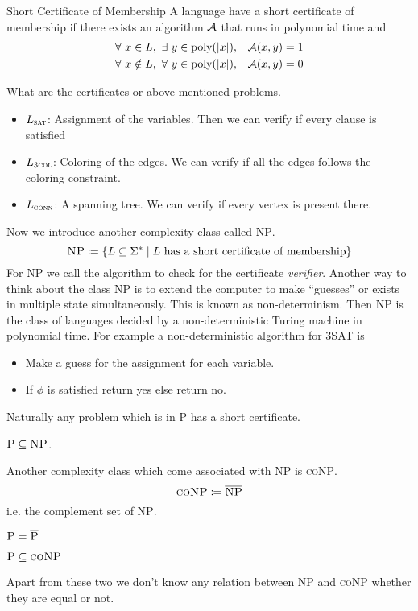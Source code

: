 \begin{Definition}{Short Certificate of Membership}{}
    A language have a short certificate of membership if there exists an algorithm $\mathcal{A}$ that runs in polynomial time and \begin{align*}
        \forall\ x\in L,\ \exists\ y\in \text{poly}(|x|),       & \quad \mathcal{A}(x,y)=1  \\
        \forall\ x\notin L,\ \forall\ y\in \text{poly}(|x|), & \quad  \mathcal{A}(x,y)=0
    \end{align*}
\end{Definition}
What are the certificates or above-mentioned problems.   \begin{itemize}
    \item $L_{\textsc{sat}}$: Assignment of the variables. Then we can verify if every clause is satisfied
    \item $L_{\textsc{3col}}$: Coloring of the edges.  We can verify if all the edges follows the coloring constraint.
    \item $L_{\textsc{conn}}$: A spanning tree. We can verify if every vertex is present there.
\end{itemize}

Now we introduce another complexity class called \textsc{NP}. $$\textsc{NP}\coloneqq \{L\subseteq \Sigma^*\mid L\text{ has a short certificate of membership}\}$$For \textsc{NP} we call the algorithm to check for the certificate \emph{verifier}.  Another way to think about the class \textsc{NP} is to extend the computer to make ``guesses'' or exists in multiple state simultaneously. This is known as non-determinism. Then \textsc{NP} is the class of languages decided by a non-deterministic Turing machine in polynomial time. For example a non-deterministic algorithm for \textsc{3SAT} is \begin{itemize}
    \item Make a guess for the assignment for each variable.
    \item If $\phi$ is satisfied return yes else return no.
\end{itemize}\parinf Naturally any problem which is in \textsc{P} has a short certificate. \begin{Theorem}{}{}
    $\textsc{P}\subseteq \textsc{NP}$.
\end{Theorem}\parinn
Another complexity class which come associated with \textsc{NP} is \textsc{coNP}. $$\textsc{coNP}\coloneqq \overline{\textsc{NP}}$$i.e. the complement set of \textsc{NP}.
\begin{observation}
    $\textsc{P}=\overline{\textsc{P}}$
\end{observation}
\begin{Theorem}{}{}
    $\textsc{P}\subseteq \textsc{coNP}$
\end{Theorem}
Apart from these two we don't know any relation between \textsc{NP} and \textsc{coNP} whether they are equal or not.
